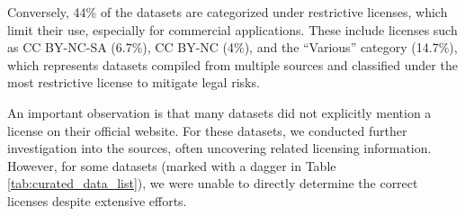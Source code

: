 Conversely, 44\% of the datasets are categorized under restrictive licenses, which limit their use, especially for commercial applications. These include licenses such as CC BY-NC-SA (6.7\%), CC BY-NC (4\%), and the ``Various'' category (14.7\%), which represents datasets compiled from multiple sources and classified under the most restrictive license to mitigate legal risks. 


An important observation is that many datasets did not explicitly mention a license on their official website. For these datasets, we conducted further investigation into the sources, often uncovering related licensing information. However, for some datasets (marked with a dagger in Table \ref{tab:curated_data_list}), we were unable to directly determine the correct licenses despite extensive efforts. 


